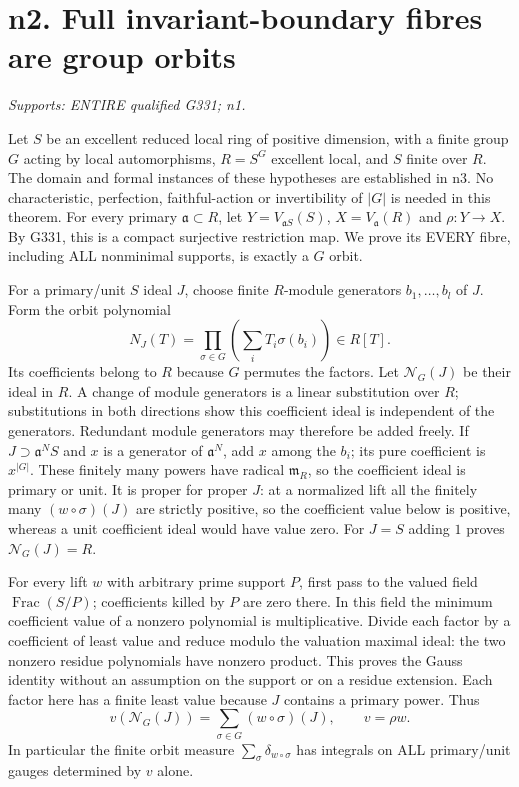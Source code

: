 \section{n2. Full invariant-boundary fibres are group orbits}
\textit{Supports: ENTIRE qualified G331; n1.}

Let $S$ be an excellent reduced local ring of positive dimension, with a finite group $G$ acting
by local automorphisms, $R=S^G$ excellent local, and $S$ finite over $R$.
The domain and formal instances of these hypotheses are established in n3.
No characteristic, perfection, faithful-action or invertibility of $|G|$
is needed in this theorem. For every primary $\mathfrak a\subset R$, let
$Y=V_{\mathfrak aS}(S)$, $X=V_{\mathfrak a}(R)$ and $\rho:Y\to X$.
By G331, this is a compact surjective restriction map. We prove its
EVERY fibre, including ALL nonminimal supports, is exactly a $G$ orbit.

For a primary/unit $S$ ideal $J$, choose finite $R$-module generators
$b_1,\ldots,b_l$ of $J$. Form the orbit polynomial
\[
 N_J(T)=\prod_{\sigma\in G}\left(\sum_i T_i\sigma(b_i)\right)\in R[T].
\]
Its coefficients belong to $R$ because $G$ permutes the factors.
Let $\mathcal N_G(J)$ be their ideal in $R$. A change of module generators
is a linear substitution over $R$; substitutions in both directions show
this coefficient ideal is independent of the generators. Redundant
module generators may therefore be added freely. If $J\supset\mathfrak
 a^N S$ and $x$ is a generator of $\mathfrak a^N$, add $x$ among the
$b_i$; its pure coefficient is $x^{|G|}$. These finitely many powers have
radical $\mathfrak m_R$, so the coefficient ideal is primary or unit.
It is proper for proper $J$: at a normalized lift all the finitely many
$(w\circ\sigma)(J)$ are strictly positive, so the coefficient value below
is positive, whereas a unit coefficient ideal would have value zero.
For $J=S$ adding $1$ proves $\mathcal N_G(J)=R$.

For every lift $w$ with arbitrary prime support $P$, first pass to the
valued field $\operatorname{Frac}(S/P)$; coefficients killed by $P$ are
zero there. In this field the minimum coefficient value of a nonzero
polynomial is multiplicative. Divide each factor by a coefficient of
least value and reduce modulo the valuation maximal ideal: the two
nonzero residue polynomials have nonzero product. This proves the Gauss
identity without an assumption on the support or on a residue extension.
Each factor here has a finite least value because $J$ contains a primary
power. Thus
\[
 v(\mathcal N_G(J))=\sum_{\sigma\in G}(w\circ\sigma)(J),\qquad v=\rho w.
\]
In particular the finite orbit measure $\sum_\sigma\delta_{w\circ\sigma}$
has integrals on ALL primary/unit gauges determined by $v$ alone.

